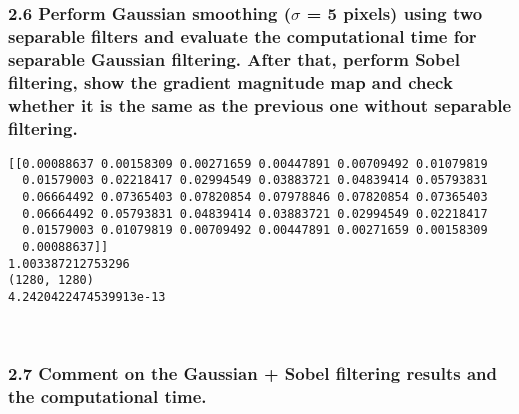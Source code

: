 \documentclass[11pt]{article}
\begin{document}
    \hypertarget{perform-gaussian-smoothing-sigma-5-pixels-using-two-separable-filters-and-evaluate-the-computational-time-for-separable-gaussian-filtering.-after-that-perform-sobel-filtering-show-the-gradient-magnitude-map-and-check-whether-it-is-the-same-as-the-previous-one-without-separable-filtering.}{%
\subsubsection{\texorpdfstring{2.6 Perform Gaussian smoothing
(\(\sigma\) = 5 pixels) using two separable filters and evaluate the
computational time for separable Gaussian filtering. After that, perform
Sobel filtering, show the gradient magnitude map and check whether it is
the same as the previous one without separable
filtering.}{2.6 Perform Gaussian smoothing (\textbackslash sigma = 5 pixels) using two separable filters and evaluate the computational time for separable Gaussian filtering. After that, perform Sobel filtering, show the gradient magnitude map and check whether it is the same as the previous one without separable filtering.}}\label{perform-gaussian-smoothing-sigma-5-pixels-using-two-separable-filters-and-evaluate-the-computational-time-for-separable-gaussian-filtering.-after-that-perform-sobel-filtering-show-the-gradient-magnitude-map-and-check-whether-it-is-the-same-as-the-previous-one-without-separable-filtering.}}

    \begin{Verbatim}[commandchars=\\\{\}]
[[0.00088637 0.00158309 0.00271659 0.00447891 0.00709492 0.01079819
  0.01579003 0.02218417 0.02994549 0.03883721 0.04839414 0.05793831
  0.06664492 0.07365403 0.07820854 0.07978846 0.07820854 0.07365403
  0.06664492 0.05793831 0.04839414 0.03883721 0.02994549 0.02218417
  0.01579003 0.01079819 0.00709492 0.00447891 0.00271659 0.00158309
  0.00088637]]
1.003387212753296
(1280, 1280)
4.2420422474539913e-13
    \end{Verbatim}

    \begin{center}
    \end{center}
    { \hspace*{\fill} \\}
    
    \hypertarget{comment-on-the-gaussian-sobel-filtering-results-and-the-computational-time.}{%
\subsubsection{2.7 Comment on the Gaussian + Sobel filtering results and
the computational
time.}\label{comment-on-the-gaussian-sobel-filtering-results-and-the-computational-time.}}
\end{document}
